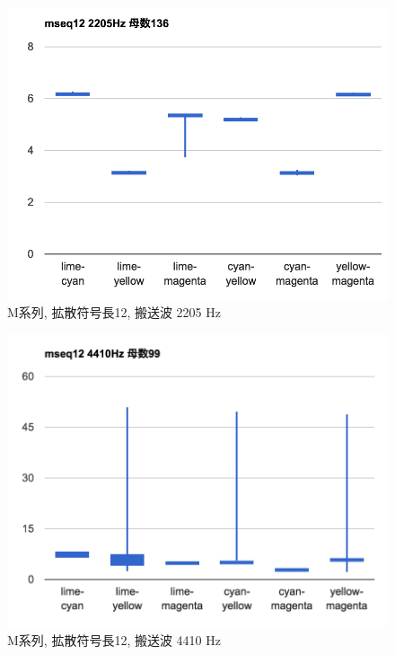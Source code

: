 \begin{figure}[p]
  \centering
  \includegraphics[clip,width=1.05\hsize]{img/m12_2205.png}
  \caption{M系列, 拡散符号長12, 搬送波 2205 Hz}\label{fig:m12Z2205}
\end{figure}

\begin{figure}[p]
  \centering
  \includegraphics[clip,width=1.05\hsize]{img/m12_4410.png}
  \caption{M系列, 拡散符号長12, 搬送波 4410 Hz}\label{fig:m12Z4410}
\end{figure}




\clearpage
